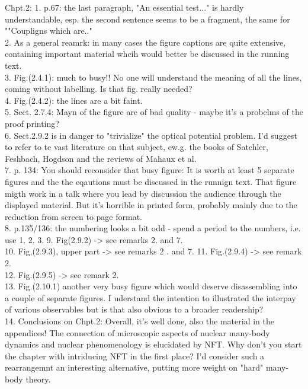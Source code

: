 \documentclass[prl,aps,12pt]{revtex4}
\begin{document}
	\newpage
Chpt.2:
1. p.67: the last paragraph, "An essential test..." is hardly understandable, 
esp. the second sentence seems to be a fragment, the same for ""Coupligns which are.."\\
2. As a general reamrk: in many cases the figure captions are quite extensive, containing 
important material whcih would better be discussed in the running text.\\
3. Fig.(2.4.1): much to busy!! No one will understand the meaning of all the lines, coming without labelling.
Is that fig. really needed?\\
4. Fig.(2.4.2): the lines are a bit faint.\\
5. Sect. 2.7.4: Mayn of the figure are of bad quality - maybe it's a probelms of the proof printing?\\
6. Sect.2.9.2 is in danger to "trivialize" the optical potential problem. I'd suggest to refer to te vast literature on that subject, 
ew.g. the books of Satchler, Feshbach, Hogdson and the reviews of Mahaux et al.   \\
7. p. 134: You should reconsider that busy figure: It is worth at least 5 separate figures and the the eqautions must be 
discussed in the runnign text. That figure migth work in a talk where you lead by discussion the audience through the
displayed material. But it's horrible in printed form, probably mainly due to the reduction from screen to page format.\\  
8. p.135/136: the numbering looks a bit odd - spend a period to the numbers, i.e. use 1. 2. 3.  
9. Fig(2.9.2) -> see remarks 2. and 7.\\
10. Fig,(2.9.3), upper part -> see remarks 2 . and 7.  
11. Fig.(2.9.4) -> see remark 2.\\
12. Fig.(2.9.5) -> see remark 2.\\
13. Fig.(2.10.1) another very busy figure which would deserve disassembling into a couple of separate figures. 
I uderstand the intention to illustrated the interpay of various observables but is that also obvious to a 
broader readership?\\
14. Conclusions on Chpt.2: Overall, it's well done, also the material in the appendices! The connection of microscopic aspects of nuclear many-body dynamics and nuclear phenomenology is elucidated
by NFT. Why don't you start the chapter with intriducing NFT in the first place? I'd consider such a rearrangemnt an 
interesting alternative, putting more weight on "hard" many-body theory.  
\end{document}
